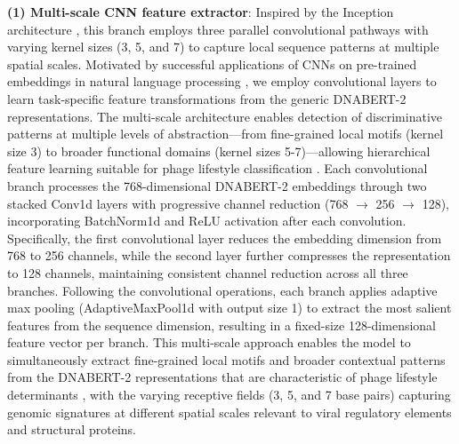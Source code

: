 \documentclass[runningheads]{llncs}
\begin{document}
\textbf{(1) Multi-scale CNN feature extractor}: Inspired by the Inception architecture \cite{szegedy2015going}, this branch employs three parallel convolutional pathways with varying kernel sizes (3, 5, and 7) to capture local sequence patterns at multiple spatial scales. Motivated by successful applications of CNNs on pre-trained embeddings in natural language processing \cite{kim2014convolutional,johnson2017deep}, we employ convolutional layers to learn task-specific feature transformations from the generic DNABERT-2 representations. The multi-scale architecture enables detection of discriminative patterns at multiple levels of abstraction—from fine-grained local motifs (kernel size 3) to broader functional domains (kernel sizes 5-7)—allowing hierarchical feature learning suitable for phage lifestyle classification \cite{johnson2017deep,szegedy2015going}. Each convolutional branch processes the 768-dimensional DNABERT-2 embeddings through two stacked Conv1d layers with progressive channel reduction (768 $\rightarrow$ 256 $\rightarrow$ 128), incorporating BatchNorm1d and ReLU activation after each convolution. Specifically, the first convolutional layer reduces the embedding dimension from 768 to 256 channels, while the second layer further compresses the representation to 128 channels, maintaining consistent channel reduction across all three branches. Following the convolutional operations, each branch applies adaptive max pooling (AdaptiveMaxPool1d with output size 1) to extract the most salient features from the sequence dimension, resulting in a fixed-size 128-dimensional feature vector per branch. This multi-scale approach enables the model to simultaneously extract fine-grained local motifs and broader contextual patterns from the DNABERT-2 representations that are characteristic of phage lifestyle determinants \cite{shang2023phatyp}, with the varying receptive fields (3, 5, and 7 base pairs) capturing genomic signatures at different spatial scales relevant to viral regulatory elements and structural proteins.
\end{document}

